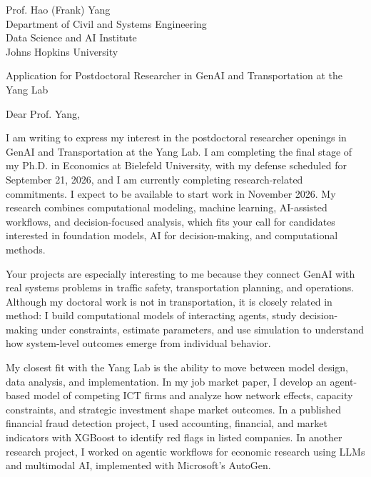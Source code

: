 \documentclass[11pt]{article}
\begin{document}
\vspace{0.1cm}

\noindent
Prof. Hao (Frank) Yang \\
Department of Civil and Systems Engineering \\
Data Science and AI Institute \\
Johns Hopkins University

\vspace{0.1cm}

\noindent
Application for Postdoctoral Researcher in GenAI and Transportation at the Yang Lab \\

\vspace{0.05cm}

\noindent Dear Prof. Yang,

I am writing to express my interest in the postdoctoral researcher openings in GenAI and Transportation at the Yang Lab. 
I am completing the final stage of my Ph.D. in Economics at Bielefeld University, with my defense scheduled for September 21, 2026, 
and I am currently completing research-related commitments. 
I expect to be available to start work in November 2026. 
My research combines computational modeling, machine learning, AI-assisted workflows, and decision-focused analysis, 
which fits your call for candidates interested in foundation models, AI for decision-making, and computational methods.

Your projects are especially interesting to me because they connect GenAI with real systems problems in traffic safety, transportation planning, and operations. 
Although my doctoral work is not in transportation, it is closely related in method: I build computational models of interacting agents, 
study decision-making under constraints, estimate parameters, and use simulation to understand how system-level outcomes emerge from individual behavior.

My closest fit with the Yang Lab is the ability to move between model design, data analysis, and implementation. 
In my job market paper, I develop an agent-based model of competing ICT firms and analyze how network effects, capacity constraints, and strategic investment shape market outcomes. 
In a published financial fraud detection project, I used accounting, financial, and market indicators with XGBoost to identify red flags in listed companies. 
In another research project, I worked on agentic workflows for economic research using LLMs and multimodal AI, implemented with Microsoft's AutoGen.
\end{document}
